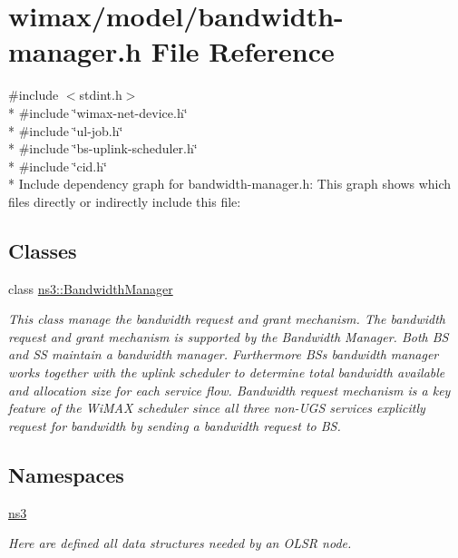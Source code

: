 \hypertarget{bandwidth-manager_8h}{}\section{wimax/model/bandwidth-\/manager.h File Reference}
\label{bandwidth-manager_8h}
{\ttfamily \#include $<$stdint.\+h$>$}\\*
{\ttfamily \#include \char`\"{}wimax-\/net-\/device.\+h\char`\"{}}\\*
{\ttfamily \#include \char`\"{}ul-\/job.\+h\char`\"{}}\\*
{\ttfamily \#include \char`\"{}bs-\/uplink-\/scheduler.\+h\char`\"{}}\\*
{\ttfamily \#include \char`\"{}cid.\+h\char`\"{}}\\*
Include dependency graph for bandwidth-\/manager.h\+:
This graph shows which files directly or indirectly include this file\+:
\subsection*{Classes}
\begin{DoxyCompactItemize}
\item 
class \hyperlink{classns3_1_1BandwidthManager}{ns3\+::\+Bandwidth\+Manager}
\begin{DoxyCompactList}\small\item\em This class manage the bandwidth request and grant mechanism. The bandwidth request and grant mechanism is supported by the Bandwidth Manager. Both BS and SS maintain a bandwidth manager. Furthermore BS\textquotesingle{}s bandwidth manager works together with the uplink scheduler to determine total bandwidth available and allocation size for each service flow. Bandwidth request mechanism is a key feature of the Wi\+M\+AX scheduler since all three non-\/\+U\+GS services explicitly request for bandwidth by sending a bandwidth request to BS. \end{DoxyCompactList}\end{DoxyCompactItemize}
\subsection*{Namespaces}
\begin{DoxyCompactItemize}
\item 
 \hyperlink{namespacens3}{ns3}
\begin{DoxyCompactList}\small\item\em Here are defined all data structures needed by an O\+L\+SR node. \end{DoxyCompactList}\end{DoxyCompactItemize}
